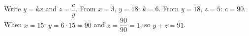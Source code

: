 Write $y=kx$ and $z=\dfrac{c}{y}$. From $x=3$, $y=18$: $k=6$. From $y=18$, $z=5$: $c=90$. When $x=15$: $y=6\cdot15=90$ and $z=\dfrac{90}{90}=1$, so $y+z=\boxed{91}$.
